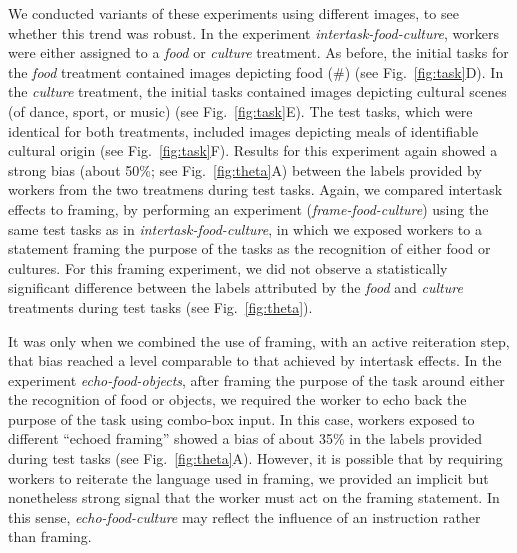\documentclass[12pt]{article}
\begin{document}
We conducted variants of these experiments using different images, to see 
whether this trend was robust.  In the experiment 
\textit{intertask-food-culture},
workers were either assigned to a \textit{food} or \textit{culture} treatment.
As before, the initial tasks for the \textit{food} treatment contained images 
depicting food (\#) (see Fig.~\ref{fig:task}D). 
In the \textit{culture} treatment, 
the initial tasks contained images depicting cultural scenes 
(of dance, sport, or music) (see Fig.~\ref{fig:task}E).  The test tasks, which were identical for both
treatments, included images depicting meals of identifiable cultural 
origin 
(see Fig.~\ref{fig:task}F).  Results for this experiment again showed a 
strong bias (about 50\%; see Fig.~\ref{fig:theta}A) between the labels 
provided by workers from the two 
treatmens during test tasks.  Again, we compared intertask effects to framing,
by performing an experiment (\textit{frame-food-culture}) using 
the same test tasks as in \textit{intertask-food-culture}, in which we exposed
workers to a statement framing the purpose of the tasks as the recognition 
of either food or cultures.  
For this framing experiment, we did not observe a statistically significant 
difference between the labels attributed by the \textit{food} and 
\textit{culture} treatments during test tasks (see Fig.~\ref{fig:theta}).

It was only when we combined the use of framing, with an active 
reiteration step, that bias reached a level comparable to that achieved 
by intertask effects.  In the experiment \textit{echo-food-objects},
after framing the purpose of the task around either the recognition of food
or objects, we required the worker to echo back the purpose of the task
using combo-box input.  In this case, workers exposed to different 
``echoed framing'' showed a bias of about 35\% in the labels provided during 
test tasks
(see Fig.~\ref{fig:theta}A). However, it is possible that by requiring 
workers to reiterate the language used in framing, we provided an implicit 
but nonetheless strong signal that the worker must act on the framing 
statement.  In this sense, \textit{echo-food-culture} may reflect the 
influence of an instruction rather than framing.
\end{document}
